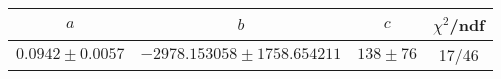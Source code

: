 \begin{tabular}{c|c|c|c}
$a$ & $b$ & $c$ & $\chi^2$/ndf \\
\hline
$0.0942\pm0.0057$ & $-2978.153058\pm1758.654211$ & $138\pm76$ & 17/46
\end{tabular}
